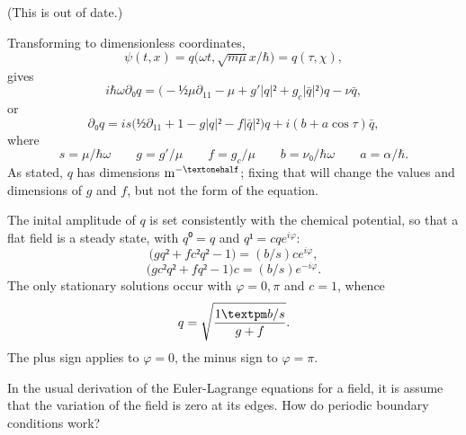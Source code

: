 
(This is out of date.)

Transforming to dimensionless coordinates, $$ψ(t,x)=q\bigl(ωt, \sqrt{mμ}x/\hbar\bigr)=q(τ,χ),$$ gives 
$$i\hbar ω∂₀q=\bigl(-½μ∂_{11}-μ+g'|q|²+g_c|\bar q|²\bigr)q-ν\bar q,$$ or
$$∂₀q=is\bigl(½∂_{11}+1-g|q|²-f|\bar q|²\bigr)q+i(b+a\cos\tau)\bar q,$$ where $$s=μ/\hbar ω\qquad g=g'/μ\qquad f=g_c/μ\qquad b=ν₀/\hbar ω\qquad a=α/\hbar.$$  As stated, $q$ has dimensions ${\rm m}^{-½}$; fixing that will change the values and dimensions of $g$ and $f$, but not the form of the equation.

The inital amplitude of $q$ is set consistently with the chemical potential, so that a flat field is a steady state, with $q⁰=q$ and $q¹=cqe^{iφ}$:
$$\bigl(gq²+fc²q²-1\bigr)=(b/s)ce^{iφ},$$
$$\bigl(gc²q²+fq²-1\bigr)c=(b/s)e^{-iφ}.$$
The only stationary solutions occur with $φ=0,π$ and $c=1$, whence
$$q=\sqrt{1±b/s\over g+f}.$$
The plus sign applies to $φ=0$, the minus sign to $φ=π$.


In the usual derivation of the Euler-Lagrange equations for a field, it is assume that the variation of the field is zero at its edges.  How do periodic boundary conditions work?

\bye